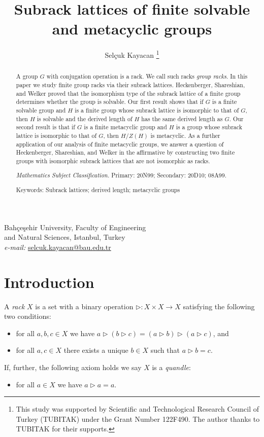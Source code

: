 \documentclass[a4paper,12pt]{article}
\author{Sel\c{c}uk Kayacan
  \thanks{This study was supported by Scientific and Technological Research Council of Turkey (TUBITAK) under the Grant Number 122F490. The author thanks to TUBITAK for their supports.}
}
\title{Subrack lattices of finite solvable and metacyclic groups}
\date{}
\theoremstyle{definition}
\theoremstyle{remark}
\begin{document}
\maketitle

\small

\begin{center}
  Bahçeşehir University, Faculty of Engineering\\ and Natural Sciences,
  Istanbul, Turkey\\
  {\it e-mail:} \href{mailto:selcuk.kayacan@bau.edu.tr}{selcuk.kayacan@bau.edu.tr}
\end{center}

\begin{abstract}
  
  A group $G$ with conjugation operation is a rack. We call such racks \emph{group racks}. In this paper we study finite group racks via their subrack lattices. Heckenberger, Shareshian, and Welker proved that the isomorphism type of the subrack lattice of a finite group determines whether the group is solvable. Our first result shows that if $G$ is a finite solvable group and $H$ is a finite group whose subrack lattice is isomorphic to that of $G$, then $H$ is solvable and the derived length of $H$ has the same derived length as $G$. Our second result is that if $G$ is a finite metacyclic group and $H$ is a group whose subrack lattice is isomorphic to that of $G$, then $H/Z(H)$ is metacyclic. As a further application of our analysis of finite metacyclic groups, we answer a question of Heckenberger, Shareshian, and Welker in the affirmative by constructing two finite groups with isomorphic subrack lattices that are not isomorphic as racks.
  
  \smallskip
   {\it Mathematics Subject Classification.} Primary: 20N99; Secondary: 20D10; 08A99.

  \smallskip
  \noindent Keywords: Subrack lattices; derived length; metacyclic groups 

\end{abstract}


\section{Introduction}

A \emph{rack} $X$ is a set with a binary operation $\triangleright\colon X\times X\to X$ satisfying the following two conditions:
\begin{itemize}
\item[(A1)] for all $a,b,c\in X$ we have $a\triangleright (b\triangleright c) = (a\triangleright b)\triangleright (a\triangleright c)$, and
\item[(A2)] for all $a,c\in X$ there exists a unique $b\in X$ such that $a\triangleright b = c$.
\end{itemize}
If, further, the following axiom holds we say $X$ is a \emph{quandle}:
\begin{itemize}
\item[(A3)] for all $a\in X$ we have $a\triangleright a = a$.
\end{itemize}
\end{document}
